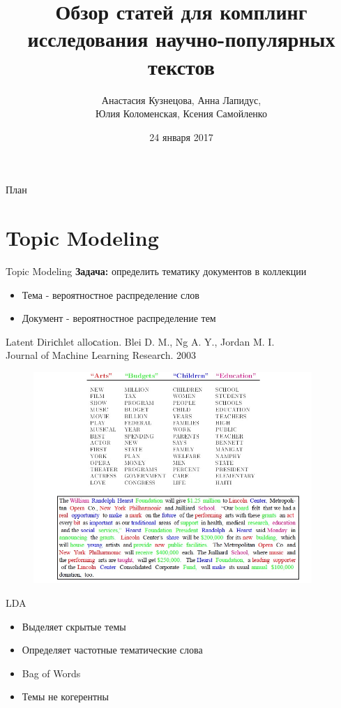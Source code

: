 \documentclass{beamer}
\title[Научно-исследовательский семинар]{Обзор статей для комплинг исследования научно-популярных текстов}
\author{Анастасия Кузнецова, Анна Лапидус, \\ Юлия Коломенская, Ксения Самойленко}
\institute{НИУ ВШЭ}
\date{24 января 2017}
\begin{document}
\begin{frame}
  \titlepage
\end{frame}

\begin{frame}{План}
  \tableofcontents
\end{frame}

\section{Topic Modeling}
\begin{frame}{Topic Modeling}
\textbf{Задача:}
определить тематику документов в коллекции

\begin{itemize}
\item Тема - вероятностное распределение слов
\item Документ - вероятностное распределение тем
\end{itemize}

Latent Diriсhlet alloсation. Blei D. M., Ng A. Y., Jordan M. I.\\ 
Journal of Maсhine Learning Researсh.  2003

\end{frame}
\begin{frame}
\begin{figure}
\includegraphics[height=8cm]{topmod1.jpg}
\end{figure}
\end{frame}


\begin{frame}{LDA}

\begin{itemize}
\item Выделяет скрытые темы
\item Определяет частотные тематические слова
\item Bag of Words
\item Темы не когерентны
\end{itemize}

\end{frame}
\end{document}
